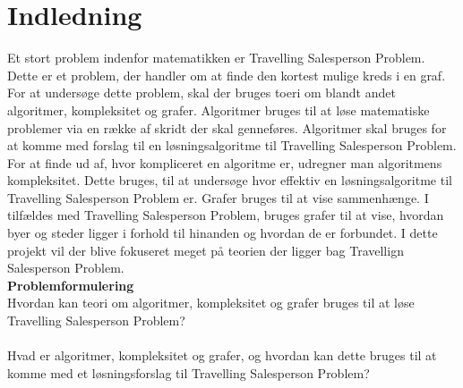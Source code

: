 \chapter{Indledning}
Et stort problem indenfor matematikken er Travelling Salesperson Problem. 
Dette er et problem, der handler om at finde den kortest mulige kreds i en graf. 
For at undersøge dette problem, skal der bruges toeri om blandt andet algoritmer, kompleksitet og grafer.
Algoritmer bruges til at løse matematiske problemer via en række af skridt der skal genneføres. 
Algoritmer skal bruges for at komme med forslag til en løsningsalgoritme til Travelling Salesperson Problem. 
For at finde ud af, hvor kompliceret en algoritme er, udregner man algoritmens kompleksitet. 
Dette bruges, til at undersøge hvor effektiv en løsningsalgoritme til Travelling Salesperson Problem er. 
Grafer bruges til at vise sammenhænge. 
I tilfældes med Travelling Salesperson Problem, bruges grafer til at vise, hvordan byer og steder ligger i forhold til hinanden og hvordan de er forbundet. 
I dette projekt vil der blive fokuseret meget på teorien der ligger bag Travellign Salesperson Problem.\\

\noindent \textbf{Problemformulering} \\
Hvordan kan teori om algoritmer, kompleksitet og grafer bruges til at løse Travelling Salesperson Problem?
\\\\
Hvad er algoritmer, kompleksitet og grafer, og hvordan kan dette bruges til at komme med et løsningsforslag til Travelling Salesperson Problem?
\\\\
